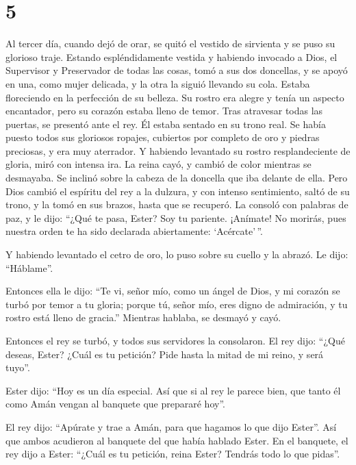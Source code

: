 \hypertarget{section-4}{%
\section{5}\label{section-4}}

 Al tercer día, cuando dejó de orar, se quitó el vestido
de sirvienta y se puso su glorioso traje. Estando espléndidamente
vestida y habiendo invocado a Dios, el Supervisor y Preservador de todas
las cosas, tomó a sus dos doncellas, y se apoyó en una, como mujer
delicada, y la otra la siguió llevando su cola. Estaba floreciendo en la
perfección de su belleza. Su rostro era alegre y tenía un aspecto
encantador, pero su corazón estaba lleno de temor. Tras atravesar todas
las puertas, se presentó ante el rey. Él estaba sentado en su trono
real. Se había puesto todos sus gloriosos ropajes, cubiertos por
completo de oro y piedras preciosas, y era muy aterrador. Y habiendo
levantado su rostro resplandeciente de gloria, miró con intensa ira. La
reina cayó, y cambió de color mientras se desmayaba. Se inclinó sobre la
cabeza de la doncella que iba delante de ella. Pero Dios cambió el
espíritu del rey a la dulzura, y con intenso sentimiento, saltó de su
trono, y la tomó en sus brazos, hasta que se recuperó. La consoló con
palabras de paz, y le dijo: ``¿Qué te pasa, Ester? Soy tu pariente.
¡Anímate! No morirás, pues nuestra orden te ha sido declarada
abiertamente: `Acércate'\,''.

 Y habiendo levantado el cetro de oro, lo puso sobre su
cuello y la abrazó. Le dijo: ``Háblame''.

Entonces ella le dijo: ``Te vi, señor mío, como un ángel de Dios, y mi
corazón se turbó por temor a tu gloria; porque tú, señor mío, eres digno
de admiración, y tu rostro está lleno de gracia.'' Mientras hablaba, se
desmayó y cayó.

Entonces el rey se turbó, y todos sus servidores la consolaron.
 El rey dijo: ``¿Qué deseas, Ester? ¿Cuál es tu petición?
Pide hasta la mitad de mi reino, y será tuyo''.

 Ester dijo: ``Hoy es un día especial. Así que si al rey
le parece bien, que tanto él como Amán vengan al banquete que prepararé
hoy''.

 El rey dijo: ``Apúrate y trae a Amán, para que hagamos lo
que dijo Ester''. Así que ambos acudieron al banquete del que había
hablado Ester.  En el banquete, el rey dijo a Ester:
``¿Cuál es tu petición, reina Ester? Tendrás todo lo que pidas''.

